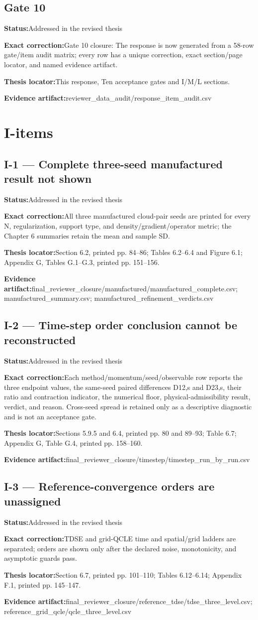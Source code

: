 \documentclass[11pt]{article}
\newcommand{\field}[2]{\textbf{#1}\quad #2\par}
\begin{document}
\subsection*{Gate 10}
\field{Status:}{Addressed in the revised thesis}
\field{Exact correction:}{Gate 10 closure: The response is now generated from a 58-row gate/item audit matrix; every row has a unique correction, exact section/page locator, and named evidence artifact.}
\field{Thesis locator:}{This response, Ten acceptance gates and I/M/L sections.}
\field{Evidence artifact:}{reviewer\_data\_audit/response\_item\_audit.csv}
\section*{I-items}
\subsection*{I-1 --- Complete three-seed manufactured result not shown}
\field{Status:}{Addressed in the revised thesis}
\field{Exact correction:}{All three manufactured cloud-pair seeds are printed for every N, regularization, support type, and density/gradient/operator metric; the Chapter 6 summaries retain the mean and sample SD.}
\field{Thesis locator:}{Section 6.2, printed pp. 84--86; Tables 6.2--6.4 and Figure 6.1; Appendix G, Tables G.1--G.3, printed pp. 151--156.}
\field{Evidence artifact:}{final\_reviewer\_closure/manufactured/manufactured\_complete.csv; manufactured\_summary.csv; manufactured\_refinement\_verdicts.csv}
\subsection*{I-2 --- Time-step order conclusion cannot be reconstructed}
\field{Status:}{Addressed in the revised thesis}
\field{Exact correction:}{Each method/momentum/seed/observable row reports the three endpoint values, the same-seed paired differences D12,s and D23,s, their ratio and contraction indicator, the numerical floor, physical-admissibility result, verdict, and reason. Cross-seed spread is retained only as a descriptive diagnostic and is not an acceptance gate.}
\field{Thesis locator:}{Sections 5.9.5 and 6.4, printed pp. 80 and 89--93; Table 6.7; Appendix G, Table G.4, printed pp. 158--160.}
\field{Evidence artifact:}{final\_reviewer\_closure/timestep/timestep\_run\_by\_run.csv}
\subsection*{I-3 --- Reference-convergence orders are unassigned}
\field{Status:}{Addressed in the revised thesis}
\field{Exact correction:}{TDSE and grid-QCLE time and spatial/grid ladders are separated; orders are shown only after the declared noise, monotonicity, and asymptotic guards pass.}
\field{Thesis locator:}{Section 6.7, printed pp. 101--110; Tables 6.12--6.14; Appendix F.1, printed pp. 145--147.}
\field{Evidence artifact:}{final\_reviewer\_closure/reference\_tdse/tdse\_three\_level.csv; reference\_grid\_qcle/qcle\_three\_level.csv}
\end{document}
